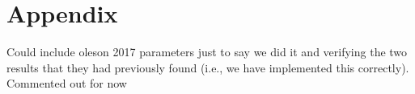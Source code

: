 \documentclass{article}
\begin{document}






\section*{Appendix}

Could include oleson 2017 parameters just to say we did it and verifying the two results that they had previously found (i.e., we have implemented this correctly). Commented out for now
\end{document}
